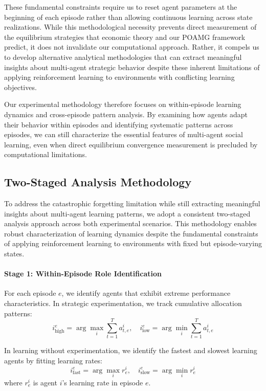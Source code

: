 These fundamental constraints require us to reset agent parameters at the beginning of each episode rather than allowing continuous learning across state realizations. While this methodological necessity prevents direct measurement of the equilibrium strategies that economic theory and our POAMG framework predict, it does not invalidate our computational approach. Rather, it compels us to develop alternative analytical methodologies that can extract meaningful insights about multi-agent strategic behavior despite these inherent limitations of applying reinforcement learning to environments with conflicting learning objectives.

Our experimental methodology therefore focuses on within-episode learning dynamics and cross-episode pattern analysis. By examining how agents adapt their behavior within episodes and identifying systematic patterns across episodes, we can still characterize the essential features of multi-agent social learning, even when direct equilibrium convergence measurement is precluded by computational limitations.

\subsection{Two-Staged Analysis Methodology}
\label{sec:two-staged-analysis}

To address the catastrophic forgetting limitation while still extracting meaningful insights about multi-agent learning patterns, we adopt a consistent two-staged analysis approach across both experimental scenarios. This methodology enables robust characterization of learning dynamics despite the fundamental constraints of applying reinforcement learning to environments with fixed but episode-varying states.

\paragraph{Stage 1: Within-Episode Role Identification} For each episode $e$, we identify agents that exhibit extreme performance characteristics. In strategic experimentation, we track cumulative allocation patterns:
\begin{equation}
    i_{\text{high}}^e = \arg\max_i \sum_{t=1}^T a_{t,e}^i, \quad 
    i_{\text{low}}^e = \arg\min_i \sum_{t=1}^T a_{t,e}^i
\end{equation}

In learning without experimentation, we identify the fastest and slowest learning agents by fitting learning rates:
\begin{equation}
    i_{\text{fast}}^e = \arg\max_i r_e^i, \quad 
    i_{\text{slow}}^e = \arg\min_i r_e^i
\end{equation}
where $r_e^i$ is agent $i$'s learning rate in episode $e$.

